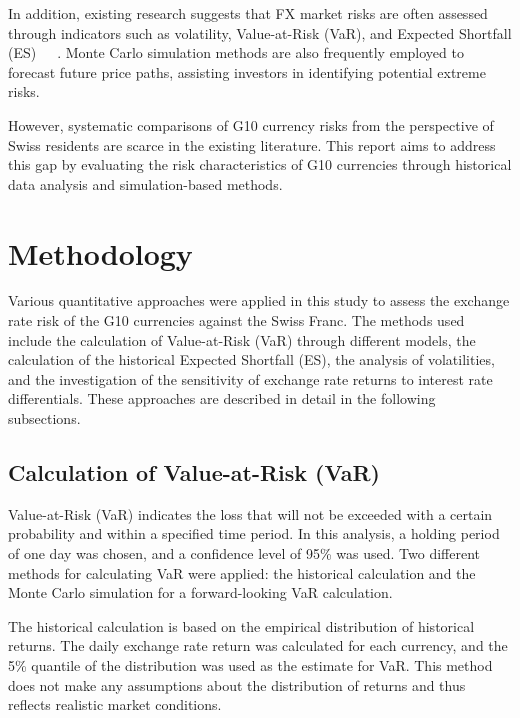\documentclass{article}
\begin{document}
In addition, existing research suggests that FX market risks are often assessed through indicators such as volatility, Value-at-Risk (VaR), and Expected Shortfall (ES)~\cite{AUBOIN_RUTA_2013}~\cite{dollar_exchange}~\cite{riker2020review}. Monte Carlo simulation methods are also frequently employed to forecast future price paths, assisting investors in identifying potential extreme risks.

However, systematic comparisons of G10 currency risks from the perspective of Swiss residents are scarce in the existing literature. This report aims to address this gap by evaluating the risk characteristics of G10 currencies through historical data analysis and simulation-based methods.

\section{Methodology}

Various quantitative approaches were applied in this study to assess the exchange rate risk of the G10 currencies against the Swiss Franc. The methods used include the calculation of Value-at-Risk (VaR) through different models, the calculation of the historical Expected Shortfall (ES), the analysis of volatilities, and the investigation of the sensitivity of exchange rate returns to interest rate differentials. These approaches are described in detail in the following subsections.

\subsection{Calculation of Value-at-Risk (VaR)}

Value-at-Risk (VaR) indicates the loss that will not be exceeded with a certain probability and within a specified time period. In this analysis, a holding period of one day was chosen, and a confidence level of 95\% was used. Two different methods for calculating VaR were applied: the historical calculation and the Monte Carlo simulation for a forward-looking VaR calculation.

The historical calculation is based on the empirical distribution of historical returns. The daily exchange rate return was calculated for each currency, and the 5\% quantile of the distribution was used as the estimate for VaR. This method does not make any assumptions about the distribution of returns and thus reflects realistic market conditions.
\end{document}
